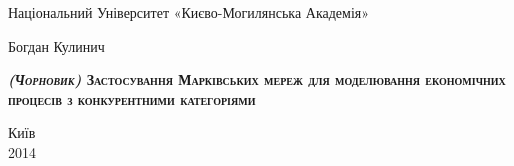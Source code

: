 \begin{titlepage}
\newpage

\begin{center}
Національний Університет «Києво-Могилянська Академія» \\
\end{center}

\vspace{8em}

\begin{center}
Богдан Кулинич
\end{center}

\vspace{2em}

\begin{center}
\textsc{\textbf{\textit{(Чорновик)} Застосування Марківських мереж для моделювання економічних процесів з конкурентними категоріями}}
\end{center}

\vspace{6em}

\vspace{\fill}

\begin{center}
Київ \\2014
\end{center}

\end{titlepage}